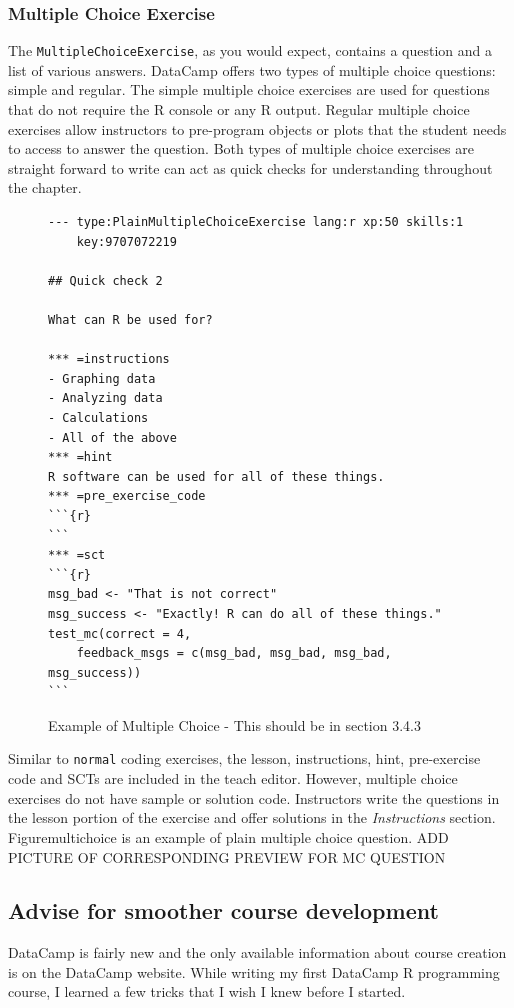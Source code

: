 \documentclass[12pt]{article}\usepackage[]{graphicx}\usepackage[]{color}
\begin{document}
\subsubsection{Multiple Choice Exercise}

The \texttt{MultipleChoiceExercise}, as you would expect, contains a question and a list of various answers. 
DataCamp offers two types of multiple choice questions: simple and regular. 
The simple multiple choice exercises are used for questions that do not require the R console or any R output. Regular multiple choice exercises 
allow instructors to pre-program objects or plots that the student needs to access to answer the question. Both types of multiple choice exercises 
are straight forward to write can act as quick checks for understanding throughout the chapter.
\begin{figure}
\caption{Example of Multiple Choice - This should be in section 3.4.3}
\begin{Verbatim}[frame=single]
--- type:PlainMultipleChoiceExercise lang:r xp:50 skills:1
    key:9707072219

## Quick check 2

What can R be used for?

*** =instructions
- Graphing data
- Analyzing data
- Calculations
- All of the above
*** =hint
R software can be used for all of these things.
*** =pre_exercise_code
```{r}
```
*** =sct
```{r}
msg_bad <- "That is not correct"
msg_success <- "Exactly! R can do all of these things."
test_mc(correct = 4, 
    feedback_msgs = c(msg_bad, msg_bad, msg_bad, msg_success))
```
\end{Verbatim}
\end{figure}
Similar to \texttt{normal} coding exercises, the lesson, instructions, hint, pre-exercise 
code and SCTs are included in the teach editor. However, multiple choice exercises do not have sample or solution code. 
Instructors write the questions in the lesson
portion of the exercise and offer solutions in the \textit{Instructions} section. Figuremultichoice is an example of plain multiple choice question. ADD PICTURE OF CORRESPONDING PREVIEW FOR MC QUESTION

\subsection{Advise for smoother course development}
DataCamp is fairly new and the only available information about course creation is on the DataCamp website. While writing my first DataCamp R programming course, I learned a few tricks that I wish I knew before I started. 
\end{document}
